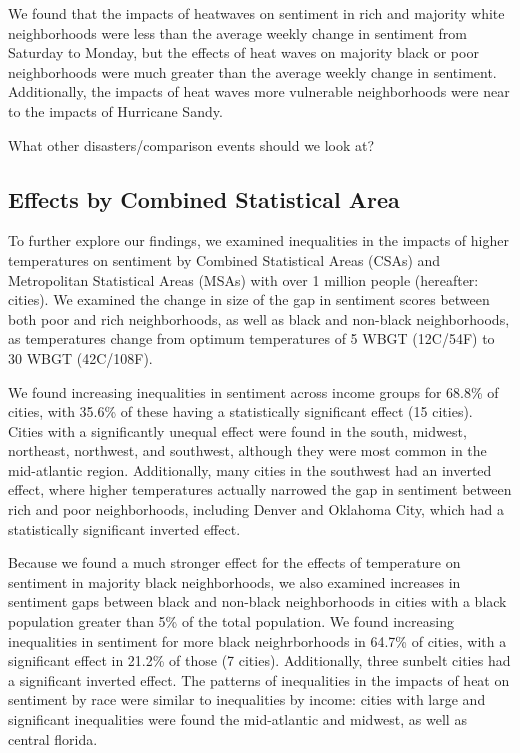 \documentclass{article}
\begin{document}
We found that the impacts of heatwaves on sentiment in rich and majority white neighborhoods were less than the average weekly change in sentiment from Saturday to Monday, but the effects of heat waves on majority black or poor neighborhoods were much greater than the average weekly change in sentiment.  Additionally, the impacts of heat waves more vulnerable neighborhoods were near to the impacts of Hurricane Sandy.

{\color{red} What other disasters/comparison events should we look at?}

\subsection{Effects by Combined Statistical Area}

To further explore our findings, we examined inequalities in the impacts of higher temperatures on sentiment by Combined Statistical Areas (CSAs) and Metropolitan Statistical Areas (MSAs) with over 1 million people (hereafter: cities).  We examined the change in size of the gap in sentiment scores between both poor and rich neighborhoods, as well as black and non-black neighborhoods, as temperatures change from optimum temperatures of 5 WBGT (12C/54F) to 30 WBGT (42C/108F).

We found increasing inequalities in sentiment across income groups for 68.8\% of cities, with 35.6\% of these having a statistically significant effect (15 cities).  Cities with a significantly unequal effect were found in the south, midwest, northeast, northwest, and southwest, although they were most common in the mid-atlantic region.  Additionally, many cities in the southwest had an inverted effect, where higher temperatures actually narrowed the gap in sentiment between rich and poor neighborhoods, including Denver and Oklahoma City, which had a statistically significant inverted effect.

Because we found a much stronger effect for the effects of temperature on sentiment in majority black neighborhoods, we also examined increases in sentiment gaps between black and non-black neighborhoods in cities with a black population greater than 5\% of the total population.  We found increasing inequalities in sentiment for more black neighrborhoods in 64.7\% of cities, with a significant effect in 21.2\% of those (7 cities).  Additionally, three sunbelt cities had a significant inverted effect.  The patterns of inequalities in the impacts of heat on sentiment by race were similar to inequalities by income: cities with large and significant inequalities were found the mid-atlantic and midwest, as well as central florida.
\end{document}
